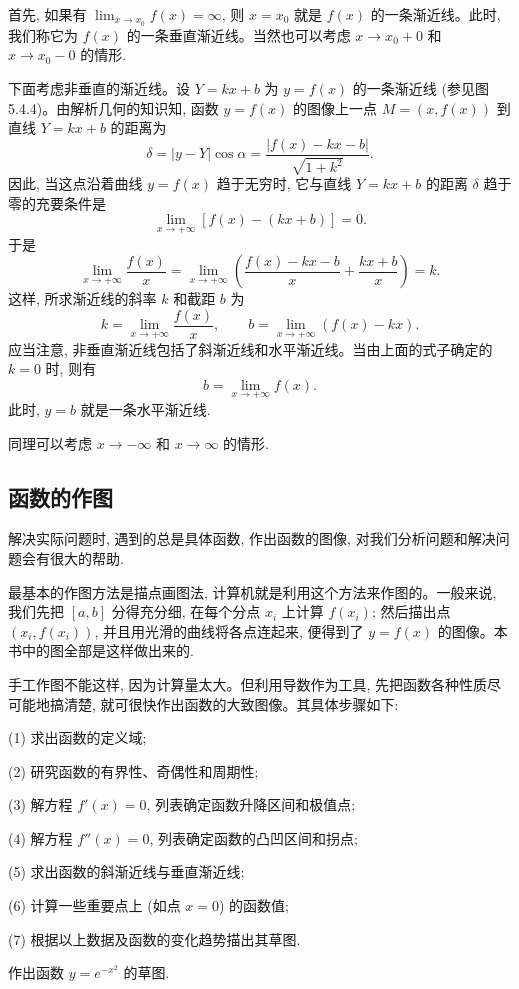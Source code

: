 首先, 如果有 $\lim_{x\to x_0}f(x)=\infty$, 则 $x=x_0$ 就是 $f(x)$ 的一条渐近线。此时, 我们称它为 $f(x)$ 的一条垂直渐近线。当然也可以考虑 $x\to x_0+0$ 和 $x\to x_0-0$ 的情形.

下面考虑非垂直的渐近线。设 $Y=kx+b$ 为 $y=f(x)$ 的一条渐近线 (参见图 5.4.4)。由解析几何的知识知, 函数 $y=f(x)$ 的图像上一点 $M=(x,f(x))$ 到直线 $Y=kx+b$ 的距离为
\[
  \delta=|y-Y|\cos\alpha=\frac{|f(x)-kx-b|}{\sqrt{1+k^2}}.
\]
因此, 当这点沿着曲线 $y=f(x)$ 趋于无穷时, 它与直线 $Y=kx+b$ 的距离 $\delta$ 趋于零的充要条件是
\[
  \lim_{x\to+\infty}[f(x)-(kx+b)]=0.
\]
于是
\[
  \lim_{x\to+\infty}\frac{f(x)}x
  =\lim_{x\to+\infty}\left(\frac{f(x)-kx-b}{x}+\frac{kx+b}{x}\right)=k.
\]
这样, 所求渐近线的斜率 $k$ 和截距 $b$ 为
\[
  k=\lim_{x\to+\infty}\frac{f(x)}x,\qquad
  b=\lim_{x\to+\infty}(f(x)-kx).
\]
应当注意, 非垂直渐近线包括了斜渐近线和水平渐近线。当由上面的式子确定的 $k=0$ 时, 则有
\[
  b=\lim_{x\to+\infty}f(x).
\]
此时, $y=b$ 就是一条水平渐近线.

同理可以考虑 $x\to-\infty$ 和 $x\to\infty$ 的情形.

\subsection{函数的作图}
\label{subsec:ma-5-4-6}

解决实际问题时, 遇到的总是具体函数, 作出函数的图像, 对我们分析问题和解决问题会有很大的帮助.

最基本的作图方法是描点画图法, 计算机就是利用这个方法来作图的。一般来说, 我们先把 $[a,b]$ 分得充分细, 在每个分点 $x_i$ 上计算 $f(x_i)$; 然后描出点 $(x_i,f(x_i))$, 并且用光滑的曲线将各点连起来, 便得到了 $y=f(x)$ 的图像。本书中的图全部是这样做出来的.

手工作图不能这样, 因为计算量太大。但利用导数作为工具, 先把函数各种性质尽可能地搞清楚, 就可很快作出函数的大致图像。其具体步骤如下:

(1) 求出函数的定义域;

(2) 研究函数的有界性、奇偶性和周期性;

(3) 解方程 $f'(x)=0$, 列表确定函数升降区间和极值点;

(4) 解方程 $f''(x)=0$, 列表确定函数的凸凹区间和拐点;

(5) 求出函数的斜渐近线与垂直渐近线;

(6) 计算一些重要点上 (如点 $x=0$) 的函数值;

(7) 根据以上数据及函数的变化趋势描出其草图.

\begin{example}\label{example:ma-5-4-12}
作出函数 $y=e^{-x^2}$ 的草图.
\end{example}


